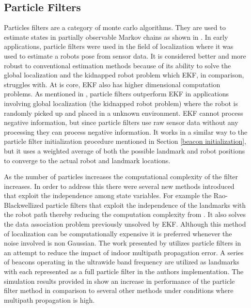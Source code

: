 \documentclass[conference]{IEEEtran}
\begin{document}
	
	
	

	
\subsection{Particle Filters}      %
	Particles filters are a category of monte carlo algorithms. They are used to estimate states in partially observable Markov chains as shown in \cite{Doucet2001}. In  early applications, particle filters were used in the field of localization where it was used to estimate a robots pose from sensor data. It is considered better and more robust to conventional estimation methods because of its ability to solve the global localization \cite{Borenstein1996} and the kidnapped robot problem \cite{Engelson1992} which EKF, in comparison, struggles with. At is core, EKF also has higher dimensional computation problems. 
	As mentioned in \cite{Thrun2002a}, particle filters outperform EKF in applications involving global localization (the kidnapped robot problem) where the robot is randomly picked up and placed in a unknown environment. EKF cannot process negative information, but since particle filters use raw sensor data without any processing they can process negative information\cite{Thrun2002a}. It works in a similar way to the particle filter initialization procedure mentioned in Section \ref{beacon initialization}, but it uses a weighted average of both the possible landmark and robot positions to converge to the actual robot and landmark locations.

	As the number of particles increases the computational complexity of the filter increases. In order to address this there were several new methods introduced that  exploit the independence among state variables. For example the Rao-Blackwellized particle filters that exploit the independence of the landmarks with the robot path thereby reducing the computation complexity from \cite{Yuan2012}. It also solves the data association problem previously unsolved by EKF. Although this method of localization can be computationally expensive it is preferred whenever the noise involved is non Gaussian. The work presented by \cite{Samyak2018} utilizes particle filters in an attempt to reduce the impact of indoor multipath propagation error. A series of beacons operating in the ultrawide band frequency are utilized as landmarks with each represented as a full particle filter in the authors implementation. The simulation results provided in \cite{Samyak2018} show an increase in performance of the particle filter method in comparison to several other methods under conditions where multipath propagation is high. 
	
\end{document}
